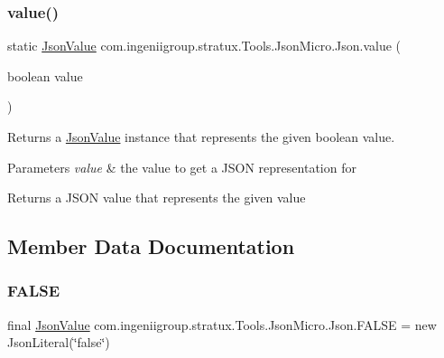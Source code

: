 \subsubsection{\texorpdfstring{value()}{value()}\hspace{0.1cm}{\footnotesize\ttfamily [6/6]}}
{\footnotesize\ttfamily static \hyperlink{classcom_1_1ingeniigroup_1_1stratux_1_1_tools_1_1_json_micro_1_1_json_value}{Json\+Value} com.\+ingeniigroup.\+stratux.\+Tools.\+Json\+Micro.\+Json.\+value (\begin{DoxyParamCaption}\item[{boolean}]{value }\end{DoxyParamCaption})\hspace{0.3cm}{\ttfamily [static]}}

Returns a \hyperlink{classcom_1_1ingeniigroup_1_1stratux_1_1_tools_1_1_json_micro_1_1_json_value}{Json\+Value} instance that represents the given {\ttfamily boolean} value.


\begin{DoxyParams}{Parameters}
{\em value} & the value to get a J\+S\+ON representation for \\
\hline
\end{DoxyParams}
\begin{DoxyReturn}{Returns}
a J\+S\+ON value that represents the given value 
\end{DoxyReturn}


\subsection{Member Data Documentation}
\mbox{\label{classcom_1_1ingeniigroup_1_1stratux_1_1_tools_1_1_json_micro_1_1_json_a4fb5c1be6ce53fd416297b03ff5cf34f}} 
\subsubsection{\texorpdfstring{F\+A\+L\+SE}{FALSE}}
{\footnotesize\ttfamily final \hyperlink{classcom_1_1ingeniigroup_1_1stratux_1_1_tools_1_1_json_micro_1_1_json_value}{Json\+Value} com.\+ingeniigroup.\+stratux.\+Tools.\+Json\+Micro.\+Json.\+F\+A\+L\+SE = new Json\+Literal(\char`\"{}false\char`\"{})\hspace{0.3cm}{\ttfamily [static]}}

